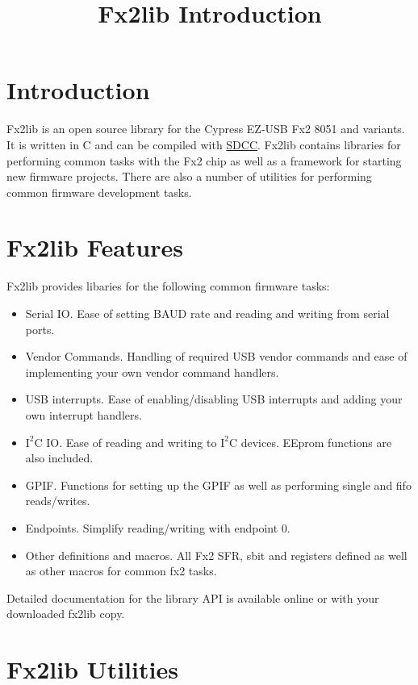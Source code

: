 \documentclass[12pt]{article}
\title{Fx2lib Introduction}
\newcommand{\itwoc}{$\text{I}^{2}\text{C}$ }
\begin{document}
\maketitle
\tableofcontents
\section{Introduction}
Fx2lib is an open source library for the Cypress EZ-USB Fx2 8051 and variants.
It is written in C and can be compiled with \href{http://sdcc.sourceforge.net}{SDCC}.
Fx2lib contains libraries for performing common tasks with the Fx2 chip as well as a framework for starting new firmware projects.
There are also a number of utilities for performing common firmware development tasks.

\section{Fx2lib Features}

Fx2lib provides libaries for the following common firmware tasks:

\begin{itemize}
 \item Serial IO.  Ease of setting BAUD rate and reading and writing from serial ports. 
 \item Vendor Commands.  Handling of required USB vendor commands and ease of implementing your own vendor command handlers. 
 \item USB interrupts.  Ease of enabling/disabling USB interrupts and adding your own interrupt handlers.
 \item \itwoc IO.  Ease of reading and writing to \itwoc devices. EEprom functions are also included. 
 \item GPIF.  Functions for setting up the GPIF as well as performing single and fifo reads/writes.
 \item Endpoints.  Simplify reading/writing with endpoint 0.
 \item Other definitions and macros.  All Fx2 SFR, sbit and registers defined as well as other macros for common fx2 tasks.
\end{itemize}

Detailed  documentation for the library API is available online or with your downloaded fx2lib copy. 

\section{Fx2lib Utilities}
\end{document}
